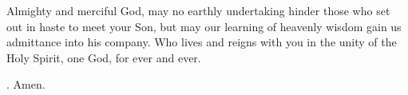 \lettrine[lines=3]{A}{}lmighty and merciful God,
may no earthly undertaking hinder those
who set out in haste to meet your Son,
but may our learning of heavenly wisdom
gain us admittance into his company.
Who lives and reigns with you in the unity of the Holy Spirit,
one God, for ever and ever. \par \Rbar. Amen.
